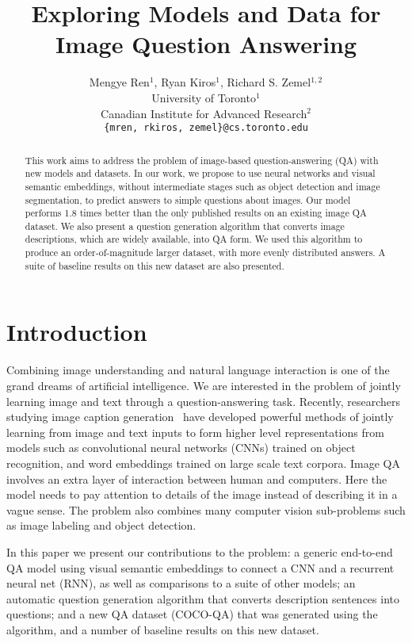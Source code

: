 \documentclass{article} \usepackage{nips15submit_e,times}
\author{
Mengye Ren${}^1$, Ryan Kiros${}^1$, Richard S. Zemel${}^{1, 2}$\\
University of Toronto${}^1$\\
Canadian Institute for Advanced Research${}^2$\\
\texttt{\{mren, rkiros, zemel\}@cs.toronto.edu}
}
\title{Exploring Models and Data for Image Question Answering}
\renewcommand{\#}[1]{\textbf{#1}}
\begin{document}
\maketitle
\begin{abstract}
This work aims to address the problem of image-based question-answering (QA)
with new models and datasets. In our work, we propose to use neural networks
and visual semantic embeddings, without intermediate stages such as object
detection and image segmentation, to predict answers to simple questions about
images. Our model performs 1.8 times better than the only published results on
an existing image QA dataset. We also present a question generation algorithm
that converts image descriptions, which are widely available, into QA form. We
used this algorithm to produce an order-of-magnitude larger dataset, with more
evenly distributed answers. A suite of baseline results on this new dataset are
also presented.
\end{abstract}

\section{Introduction}
Combining image understanding and natural language interaction is one of the
grand dreams of artificial intelligence. We are interested in the problem of
jointly learning image and text through a question-answering task. Recently,
researchers studying image caption generation~\cite{vinyals14,kiros14b,
karpathy14,mao14,donahue14,chen14,fang14,xu15,lebret15,klein15} have developed
powerful methods of jointly learning from image and text inputs to form higher
level representations from models such as convolutional neural networks (CNNs)
trained on object recognition, and word embeddings trained on large scale text
corpora. Image QA involves an extra layer of interaction between human and
computers. Here the model needs to pay attention to details of the image
instead of describing it in a vague sense. The problem also combines many
computer vision sub-problems such as image labeling and object detection.

In this paper we present our contributions to the problem: a generic end-to-end
QA model using visual semantic embeddings to connect a CNN and a recurrent
neural net (RNN), as well as comparisons to a suite of other models; an
automatic question generation algorithm that converts description sentences
into questions; and a new QA dataset (COCO-QA) that was generated using the
algorithm, and a number of baseline results on this new dataset.
\end{document}

